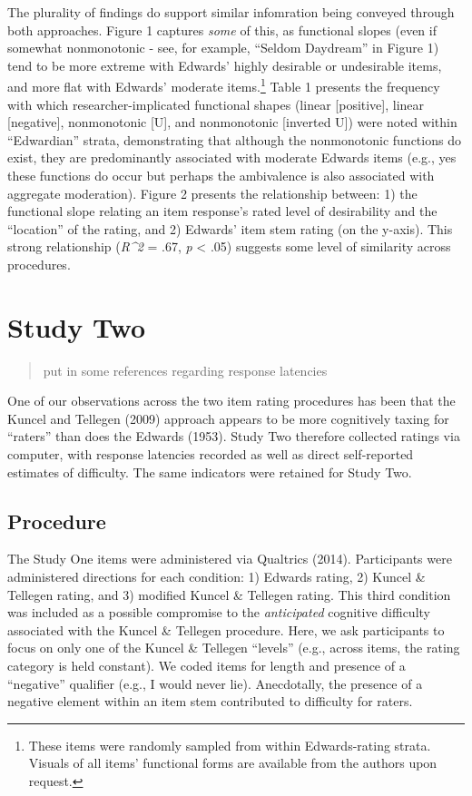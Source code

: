 \documentclass[
  english,
  ,jou]{apa6}
\begin{document}
The plurality of findings do support similar infomration being conveyed through both approaches. Figure 1 captures \emph{some} of this, as functional slopes (even if somewhat nonmonotonic - see, for example, \enquote{Seldom Daydream} in Figure 1) tend to be more extreme with Edwards' highly desirable or undesirable items, and more flat with Edwards' moderate items.\footnote{These items were randomly sampled from within Edwards-rating strata. Visuals of all items' functional forms are available from the authors upon request.} Table 1 presents the frequency with which researcher-implicated functional shapes (linear {[}positive{]}, linear {[}negative{]}, nonmonotonic {[}U{]}, and nonmonotonic {[}inverted U{]}) were noted within \enquote{Edwardian} strata, demonstrating that although the nonmonotonic functions do exist, they are predominantly associated with moderate Edwards items (e.g., yes these functions do occur but perhaps the ambivalence is also associated with aggregate moderation). Figure 2 presents the relationship between: 1) the functional slope relating an item response's rated level of desirability and the \enquote{location} of the rating, and 2) Edwards' item stem rating (on the y-axis). This strong relationship (\emph{R\^{}2} = .67, \emph{p} \textless{} .05) suggests some level of similarity across procedures.

\hypertarget{study-two}{%
\section{Study Two}\label{study-two}}

\begin{quote}
put in some references regarding response latencies
\end{quote}

One of our observations across the two item rating procedures has been that the Kuncel and Tellegen (2009) approach appears to be more cognitively taxing for \enquote{raters} than does the Edwards (1953). Study Two therefore collected ratings via computer, with response latencies recorded as well as direct self-reported estimates of difficulty. The same indicators were retained for Study Two.

\hypertarget{procedure-1}{%
\subsection{Procedure}\label{procedure-1}}

The Study One items were administered via Qualtrics (2014). Participants were administered directions for each condition: 1) Edwards rating, 2) Kuncel \& Tellegen rating, and 3) modified Kuncel \& Tellegen rating. This third condition was included as a possible compromise to the \emph{anticipated} cognitive difficulty associated with the Kuncel \& Tellegen procedure. Here, we ask participants to focus on only one of the Kuncel \& Tellegen \enquote{levels} (e.g., across items, the rating category is held constant). We coded items for length and presence of a \enquote{negative} qualifier (e.g., I would never lie). Anecdotally, the presence of a negative element within an item stem contributed to difficulty for raters.
\end{document}
